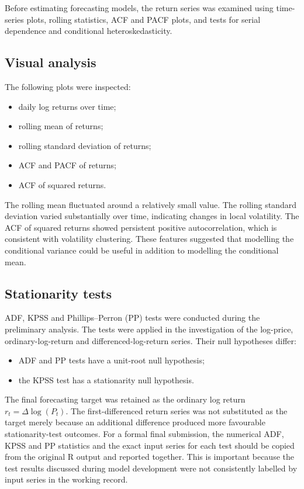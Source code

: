 \documentclass[10pt,a4paper]{article}
\begin{document}
Before estimating forecasting models, the return series was examined using time-series plots, rolling statistics, ACF and PACF plots, and tests for serial dependence and conditional heteroskedasticity.

\subsection{Visual analysis}

The following plots were inspected:
\begin{itemize}[leftmargin=2em]
  \item daily log returns over time;
  \item rolling mean of returns;
  \item rolling standard deviation of returns;
  \item ACF and PACF of returns;
  \item ACF of squared returns.
\end{itemize}

The rolling mean fluctuated around a relatively small value. The rolling standard deviation varied substantially over time, indicating changes in local volatility. The ACF of squared returns showed persistent positive autocorrelation, which is consistent with volatility clustering. These features suggested that modelling the conditional variance could be useful in addition to modelling the conditional mean.

\subsection{Stationarity tests}

ADF, KPSS and Phillips--Perron (PP) tests were conducted during the preliminary analysis. The tests were applied in the investigation of the log-price, ordinary-log-return and differenced-log-return series. Their null hypotheses differ:
\begin{itemize}[leftmargin=2em]
  \item ADF and PP tests have a unit-root null hypothesis;
  \item the KPSS test has a stationarity null hypothesis.
\end{itemize}

The final forecasting target was retained as the ordinary log return $r_t=\Delta\log(P_t)$. The first-differenced return series was not substituted as the target merely because an additional difference produced more favourable stationarity-test outcomes. For a formal final submission, the numerical ADF, KPSS and PP statistics and the exact input series for each test should be copied from the original R output and reported together. This is important because the test results discussed during model development were not consistently labelled by input series in the working record.
\end{document}
